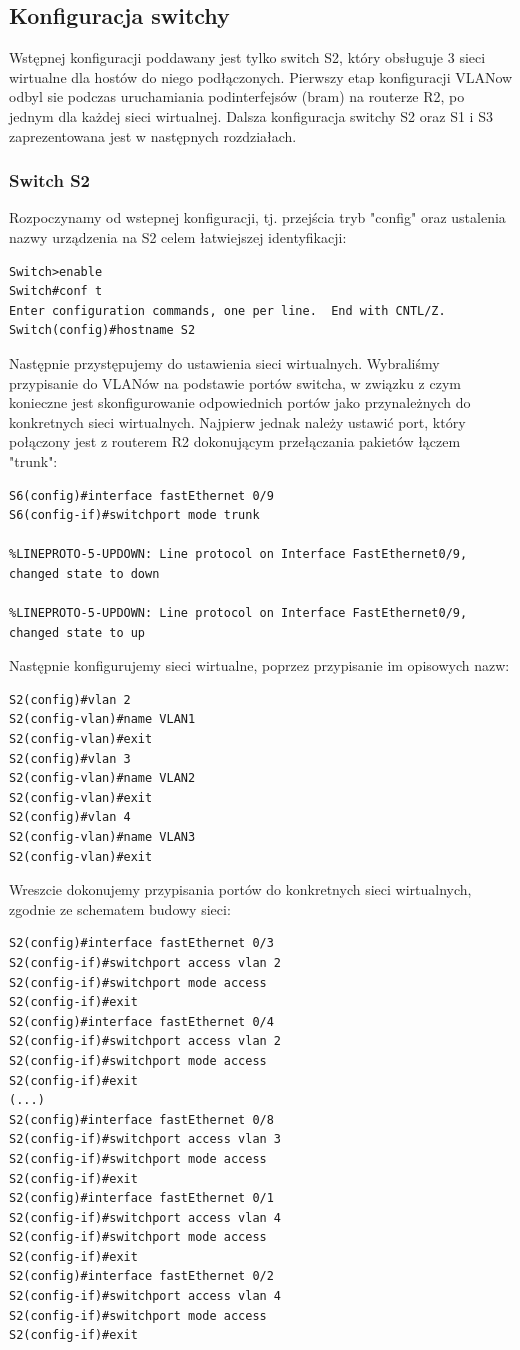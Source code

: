 \documentclass[polish,11pt,a4paper,twoside]{article}
\begin{document}
\subsection{Konfiguracja switchy}
Wstępnej konfiguracji poddawany jest tylko switch S2, który obsługuje 3 sieci wirtualne dla hostów do niego podłączonych. Pierwszy etap konfiguracji VLANow odbyl sie podczas uruchamiania podinterfejsów (bram) na routerze R2, po jednym dla każdej sieci wirtualnej.
Dalsza konfiguracja switchy S2 oraz S1 i S3 zaprezentowana jest w następnych rozdziałach.

\subsubsection{Switch S2}

Rozpoczynamy od wstepnej konfiguracji, tj. przejścia tryb "config" oraz ustalenia nazwy urządzenia na S2 celem łatwiejszej identyfikacji:
\begin{lstlisting}
Switch>enable
Switch#conf t
Enter configuration commands, one per line.  End with CNTL/Z.
Switch(config)#hostname S2
\end{lstlisting}
Następnie przystępujemy do ustawienia sieci wirtualnych. Wybraliśmy przypisanie do VLANów na podstawie portów switcha, w związku z czym konieczne jest skonfigurowanie odpowiednich portów jako przynależnych do konkretnych sieci wirtualnych. Najpierw jednak należy ustawić port, który połączony jest z routerem R2 dokonującym przełączania pakietów łączem "trunk":
\begin{lstlisting}
S6(config)#interface fastEthernet 0/9
S6(config-if)#switchport mode trunk 

%LINEPROTO-5-UPDOWN: Line protocol on Interface FastEthernet0/9, changed state to down

%LINEPROTO-5-UPDOWN: Line protocol on Interface FastEthernet0/9, changed state to up
\end{lstlisting}
Następnie konfigurujemy sieci wirtualne, poprzez przypisanie im opisowych nazw:
\begin{lstlisting}
S2(config)#vlan 2
S2(config-vlan)#name VLAN1
S2(config-vlan)#exit
S2(config)#vlan 3
S2(config-vlan)#name VLAN2
S2(config-vlan)#exit
S2(config)#vlan 4
S2(config-vlan)#name VLAN3
S2(config-vlan)#exit
\end{lstlisting}
Wreszcie dokonujemy przypisania portów do konkretnych sieci wirtualnych, zgodnie ze schematem budowy sieci:
\begin{lstlisting}
S2(config)#interface fastEthernet 0/3
S2(config-if)#switchport access vlan 2
S2(config-if)#switchport mode access 
S2(config-if)#exit
S2(config)#interface fastEthernet 0/4
S2(config-if)#switchport access vlan 2
S2(config-if)#switchport mode access 
S2(config-if)#exit
(...)
S2(config)#interface fastEthernet 0/8
S2(config-if)#switchport access vlan 3
S2(config-if)#switchport mode access 
S2(config-if)#exit
S2(config)#interface fastEthernet 0/1
S2(config-if)#switchport access vlan 4
S2(config-if)#switchport mode access 
S2(config-if)#exit
S2(config)#interface fastEthernet 0/2
S2(config-if)#switchport access vlan 4
S2(config-if)#switchport mode access 
S2(config-if)#exit
\end{lstlisting}
\end{document}
